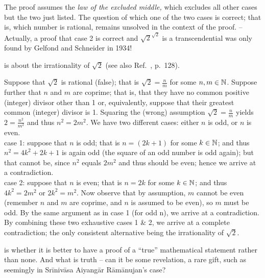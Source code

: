 The proof assumes the {\em law of the excluded middle,}
which excludes all other cases but the two just listed.
The question of which one of the two cases is correct; that is,
which number is rational, remains unsolved in the context of the proof.
--
Actually, a proof that case 2 is correct and  $\sqrt{2} ^{
 \sqrt{2} }$ is a transcendential was only found by  Gelfond and Schneider
in 1934!


 is about the irrationality of $\sqrt{2}$
(see also Ref.~\cite{Alsina}, p.~128).

{\color{OliveGreen}
\bproof
Suppose that $\sqrt{2}$ is rational (false); that is
$\sqrt{2} = \frac{n}{m}$ for some $n, m \in {\Bbb N}$.
Suppose further that $n$ and $m$ are coprime;
that is, that they have no common positive (integer) divisor other than 1 or, equivalently,
suppose that their greatest common (integer) divisor is 1.
Squaring the  (wrong) assumption $\sqrt{2} = \frac{n}{m}$ yields $2= \frac{n^2}{m^2}$ and thus $n^2 =2m^2$.
We have two different cases: either $n$ is odd, or $n$ is even.
 \\
case 1: suppose that $n$ is odd; that is $n=(2k+1)$ for some $k\in {\Bbb N}$; and thus
$n^2 = 4k^2+2k+1$ is again odd (the square of an odd number is odd again); but that cannot be,
since $n^2$ equals $2m^2$ and thus should be even; hence we arrive at a contradiction.
\\
case 2:  suppose that $n$ is even;  that is $n=2k$ for some $k\in {\Bbb N}$; and thus
$4k^2 = 2m^2$ or $2k^2 = m^2$.
Now observe that by assumption, $m$ cannot be even (remember  $n$ and $m$ are coprime, and
$n$ is assumed to be even), so $m$ must be odd. By the same argument as in case 1 (for odd n),
we arrive at a contradiction.
By combining these two exhaustive cases 1 \& 2, we arrive at a complete contradiction;
the only consistent alternative being the irrationality of $\sqrt{2}$.
\eproof
}


 is whether it is better to have a proof of a ``true'' mathematical statement rather than none.
And what is truth -- can it be some revelation, a rare gift, such as seemingly in Sr\={i}niv\={a}sa Aiyang\={a}r
R\={a}m\={a}nujan's case?


